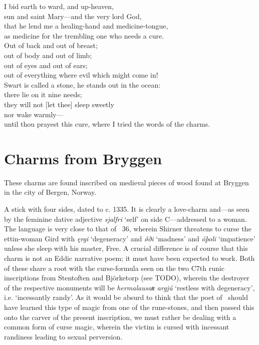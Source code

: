 \bvb I bid earth to ward, and up-heaven, \\
sun and saint Mary—and the very lord God, \\
that he lend me a healing-hand and medicine-tongue, \\
as medicine for the trembling one who needs a cure. \\
Out of back and out of breast; \\
out of body and out of limb; \\
out of eyes and out of ears; \\
out of everything where evil which might come in! \\
Swart is called a stone, he stands out in the ocean: \\
there lie on it nine needs; \\
they will not [let thee] sleep sweetly \\
nor wake warmly— \\
until thou prayest this cure, where I tried the words of the charms.\evb
\evg

\section{Charms from Bryggen}

These charms are found inscribed on medieval pieces of wood found at Bryggen in the city of Bergen, Norway.

\sectionline

A stick with four sides, dated to c. 1335. It is clearly a love-charm and—as seen by the feminine dative adjective \emph{sjalfri} ‘self’ on side C—addressed to a woman. The language is very close to that of \Skirnismal\ 36, wherein Shirner threatens to curse the ettin-woman Gird with \emph{ęrgi} ‘degeneracy’ and \emph{ǿði} ‘madness’ and \emph{óþoli} ‘impatience’ unless she sleep with his master, Free. A crucial difference is of course that this charm is not an Eddic narrative poem; it must have been expected to work. Both of these share a root with the curse-formula seen on the two C7th runic inscriptions from Stentoften and Björketorp (see TODO), wherein the destroyer of the respective monuments will be \emph{hermalausaʀ argjú} ‘restless with degeneracy’, i.e. ‘incessantly randy’. As it would be absurd to think that the poet of \Skirnismal\ should have learned this type of magic from one of the rune-stones, and then passed this onto the carver of the present inscription, we must rather be dealing with a common form of curse magic, wherein the victim is cursed with incessant randiness leading to sexual perversion.

